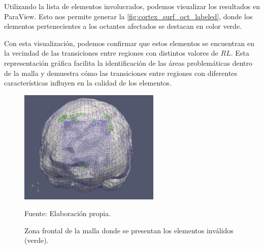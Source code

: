 Utilizando la lista de elementos involucrados, podemos visualizar los resultados en ParaView. Esto nos permite generar la \autoref{fig:cortex_surf_oct_labeled}, donde los elementos pertenecientes a los octantes afectados se destacan en color verde. 

Con esta visualización, podemos confirmar que estos elementos se encuentran en la vecindad de las transiciones entre regiones con distintos valores de $RL$. Esta representación gráfica facilita la identificación de las áreas problemáticas dentro de la malla y demuestra cómo las transiciones entre regiones con diferentes características influyen en la calidad de los elementos.


\begin{figure}[!ht]
    \centering
    \includegraphics[width=0.6\textwidth]{figures/labeled_octs/labeled_oct_c_5r7_0.png}
    \caption{ Zona frontal de la malla donde se presentan los elementos inválidos (verde). }
    Fuente: Elaboración propia.
    \label{fig:cortex_surf_oct_labeled}
\end{figure}

